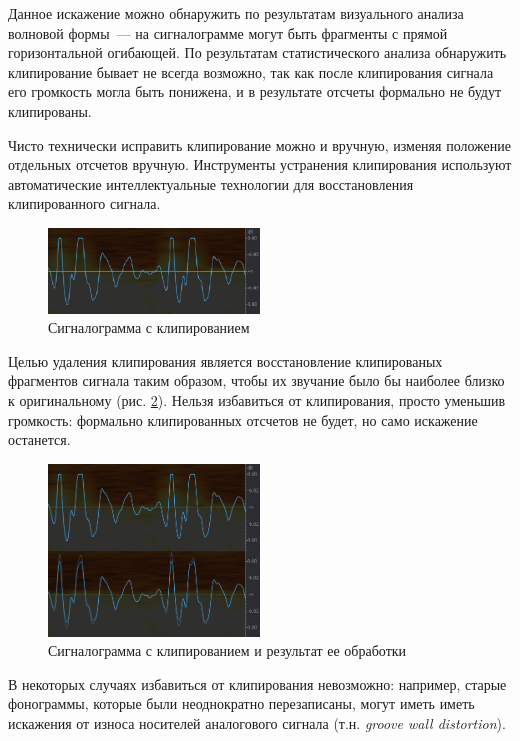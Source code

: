 \documentclass[oneside, final, 14pt]{extreport}
\begin{document}
Данное искажение можно обнаружить по результатам визуального анализа волновой формы~--- на сигналограмме могут быть фрагменты с прямой горизонтальной огибающей. По результатам статистического анализа обнаружить клипирование бывает не всегда возможно, так как после клипирования сигнала его громкость могла быть понижена, и в результате отсчеты формально не будут клипированы.

Чисто технически исправить клипирование можно и вручную, изменяя положение отдельных отсчетов вручную. Инструменты устранения клипирования используют автоматические интеллектуальные технологии для восстановления клипированного сигнала.

\begin{figure}[h!]
\centering
\includegraphics[width=0.5\textwidth]{pic-clip-01}
\caption{Сигналограмма с клипированием}
\label{pic-clip-01}
\end{figure}

Целью удаления клипирования является восстановление клипированых фрагментов сигнала таким образом, чтобы их звучание было бы наиболее близко к оригинальному (рис. \ref{pic-clip-02}). Нельзя избавиться от клипирования, просто уменьшив громкость: формально клипированных отсчетов не будет, но само искажение останется.

\begin{figure}[h!]
\centering
\includegraphics[width=0.5\textwidth]{pic-clip-02}
\caption{Сигналограмма с клипированием и результат ее обработки}
\label{pic-clip-02}
\end{figure}

В некоторых случаях избавиться от клипирования невозможно: например, старые фонограммы, которые были неоднократно перезаписаны, могут иметь иметь искажения от износа носителей аналогового сигнала (т.н. \emph{groove wall distortion}).
\end{document}
